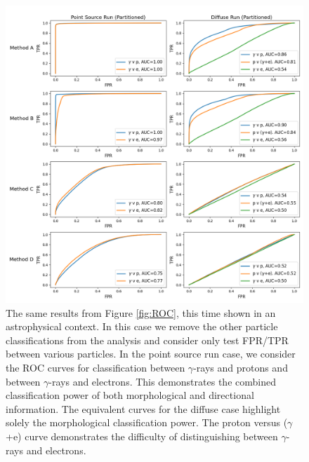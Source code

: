 \begin{figure}
  \centering
  \includegraphics[width=\textwidth]{figures/abelardo.png}
  \caption{The same results from Figure \ref{fig:ROC}, this time shown in an astrophysical context. In this case we remove the other particle classifications from the analysis and consider only test FPR/TPR between various particles. In the point source run case, we consider the ROC curves for classification between $\gamma$-rays and protons and between $\gamma$-rays and electrons. This demonstrates the combined classification power of both morphological and directional information. The equivalent curves for the diffuse case highlight solely the morphological classification power. The proton versus ($\gamma$+e) curve demonstrates the difficulty  of distinguishing between $\gamma$-rays and electrons.
  }
  \label{fig:ROC2}
\end{figure}

